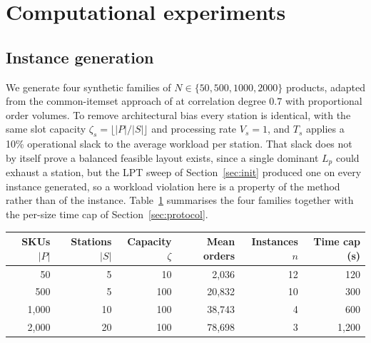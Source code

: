 \documentclass[]{interact}
\begin{document}
\section{Computational experiments}\label{sec:experiments}
\subsection{Instance generation}
We generate four synthetic families of $N \in \{50, 500, 1000, 2000\}$ products, adapted from the common-itemset approach of \citet{zhang2019cie} at correlation degree $0.7$ with proportional order volumes. To remove architectural bias every station is identical, with the same slot capacity $\zeta_s = \lfloor |P|/|S| \rfloor$ and processing rate $V_s = 1$, and $T_s$ applies a 10\% operational slack to the average workload per station. That slack does not by itself prove a balanced feasible layout exists, since a single dominant $L_p$ could exhaust a station, but the LPT sweep of Section~\ref{sec:init} produced one on every instance generated, so a workload violation here is a property of the method rather than of the instance. Table~\ref{tab:families} summarises the four families together with the per-size time cap of Section~\ref{sec:protocol}.

\begin{table}[H]
\centering
{}
{\begin{tabular*}{\textwidth}{@{\extracolsep{\fill}}rrrrrr@{}}
\toprule
SKUs $|P|$ & Stations $|S|$ & Capacity $\zeta$ & Mean orders & Instances $n$ & Time cap (s) \\
\midrule
50      & 5  & 10  & 2{,}036  & 12 & 120 \\
500     & 5  & 100 & 20{,}832 & 10 & 300 \\
1{,}000 & 10 & 100 & 38{,}743 & 4  & 600 \\
2{,}000 & 20 & 100 & 78{,}698 & 3  & 1{,}200 \\
\bottomrule
\end{tabular*}}
\label{tab:families}
\end{table}
\end{document}
